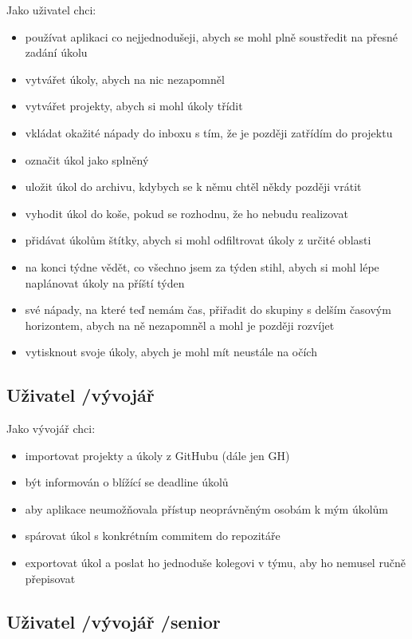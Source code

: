 Jako uživatel chci:

\begin{itemize}
\item používat aplikaci co nejjednodušeji, abych se mohl plně soustředit na přesné zadání úkolu
\item vytvářet úkoly, abych na nic nezapomněl
\item vytvářet projekty, abych si mohl úkoly třídit
\item vkládat okažité nápady do inboxu s tím, že je později zatřídím do projektu
\item označit úkol jako splněný
\item uložit úkol do archivu, kdybych se k němu chtěl někdy později vrátit
\item vyhodit úkol do koše, pokud se rozhodnu, že ho nebudu realizovat
\item přidávat úkolům štítky, abych si mohl odfiltrovat úkoly z určité oblasti
\item na konci týdne vědět, co všechno jsem za týden stihl, abych si mohl lépe naplánovat úkoly na příští týden
\item své nápady, na které teď nemám čas, přiřadit do skupiny s delším časovým horizontem, abych na ně nezapomněl a mohl je později rozvíjet
\item vytisknout svoje úkoly, abych je mohl mít neustále na očích
\end{itemize}

\subsection{Uživatel \slash  vývojář}

Jako vývojář chci:

\begin{itemize}
\item importovat projekty a úkoly z GitHubu (dále jen GH)
\item být informován o blížící se deadline úkolů
\item aby aplikace neumožňovala přístup neoprávněným osobám k mým úkolům
\item spárovat úkol s konkrétním commitem do repozitáře
\item exportovat úkol a poslat ho jednoduše kolegovi v týmu, aby ho nemusel ručně přepisovat
\end{itemize}

\subsection{Uživatel \slash  vývojář \slash  senior}

